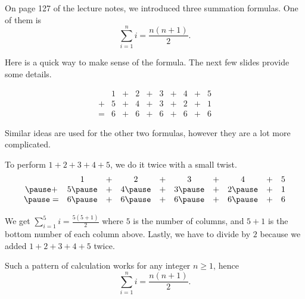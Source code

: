 \documentclass[12pt]{beamer}
\begin{document}
 
\begin{frame}[t]
  On page 127 of the lecture notes, we introduced three summation formulas. One of them is
  \[
    \sum_{i=1}^{n} i = \frac{n(n+1)}{2}.
  \]

  Here is a quick way to make sense of the formula. 
  The next few slides provide some details.
  \medskip

  \[
    \begin{array}{cccccccccc}
          & 1 &+& 2 &+& 3 &+& 4 &+& 5 \\
      + & 5 &+& 4 &+& 3 &+& 2 &+& 1 \\
      = & 6 &+& 6 &+& 6 &+& 6 &+& 6
    \end{array}
  \]

  Similar ideas are used for the other two formulas, however they are a lot more complicated. 
\end{frame}

\begin{frame}[t]
  To perform \(1 + 2 + 3 + 4 + 5\), we do it twice with a small twist.
  \[
    \begin{array}{cccccccccc}
        & 1 &+& 2 &+& 3 &+& 4 &+& 5 \\
      \pause + & 5 \pause &+& 4 \pause &+& 3 \pause &+& 2 \pause &+& 1 \\
      \pause = & 6 \pause &+& 6 \pause &+& 6 \pause &+& 6 \pause &+& 6
    \end{array}
  \]

  \pause
  We get \(\sum_{i=1}^{5} i = \frac{5(5+1)}{2}\) where \(5\) is the number of columns, and \(5+1\) is the bottom number of each column above.  Lastly, we have to divide by \(2\) because we added \(1 + 2 + 3 + 4 + 5\) twice.

  \pause
  Such a pattern of calculation works for any integer \(n \ge 1\), hence
  \[
    \sum_{i=1}^{n} i = \frac{n(n+1)}{2}.
  \]
\end{frame}
\end{document}
